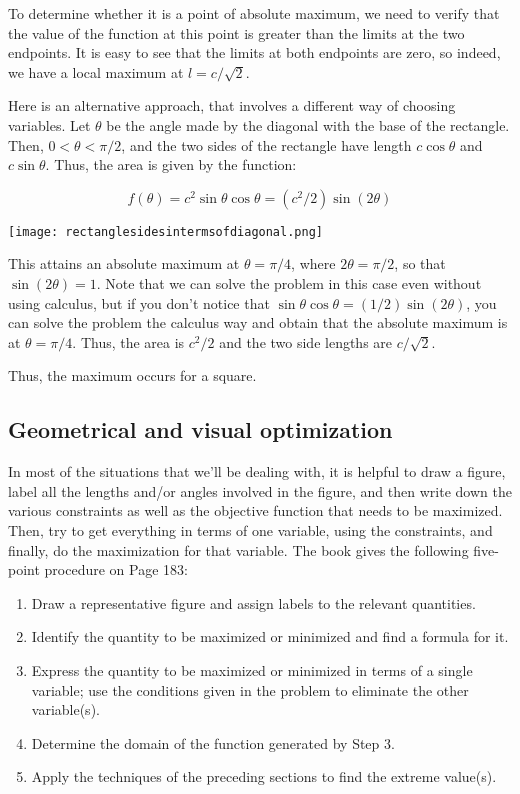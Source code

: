 \documentclass[10pt]{amsart}
\begin{document}
To determine whether it is a point of absolute maximum, we need to
verify that the value of the function at this point is greater than
the limits at the two endpoints. It is easy to see that the limits at
both endpoints are zero, so indeed, we have a local maximum at $l =
c/\sqrt{2}$.

Here is an alternative approach, that involves a different way of
choosing variables. Let $\theta$ be the angle made by the diagonal
with the base of the rectangle. Then, $0 < \theta < \pi/2$, and the
two sides of the rectangle have length $c \cos \theta$ and $c \sin
\theta$. Thus, the area is given by the function:

$$f(\theta) = c^2 \sin \theta \cos \theta = (c^2/2) \sin (2\theta)$$

\texttt{[image: rectanglesidesintermsofdiagonal.png]}

This attains an absolute maximum at $\theta = \pi/4$, where $2\theta =
\pi/2$, so that $\sin (2\theta) = 1$. Note that we can solve the
problem in this case even without using calculus, but if you don't
notice that $\sin \theta \cos \theta = (1/2) \sin (2\theta)$, you can
solve the problem the calculus way and obtain that the absolute
maximum is at $\theta = \pi/4$. Thus, the area is $c^2/2$ and the two
side lengths are $c/\sqrt{2}$.

Thus, the maximum occurs for a square.

\subsection{Geometrical and visual optimization}

In most of the situations that we'll be dealing with, it is helpful to
draw a figure, label all the lengths and/or angles involved in the
figure, and then write down the various constraints as well as the
objective function that needs to be maximized. Then, try to get
everything in terms of one variable, using the constraints, and
finally, do the maximization for that variable. The book gives the
following five-point procedure on Page 183:

\begin{enumerate}
\item Draw a representative figure and assign labels to the relevant
  quantities.
\item Identify the quantity to be maximized or minimized and find a
  formula for it.
\item Express the quantity to be maximized or minimized in terms of a
  single variable; use the conditions given in the problem to
  eliminate the other variable(s).
\item Determine the domain of the function generated by Step 3.
\item Apply the techniques of the preceding sections to find the
  extreme value(s).
\end{enumerate}
\end{document}
